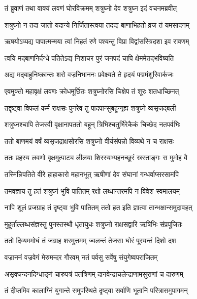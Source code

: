 \twolineshloka
{तं ब्रुवाणं तथा वाक्यं लवणं घोरविक्रमम्}
{शत्रुघ्नो देव शत्रुघ्न इदं वचनमब्रवीत्} %

\twolineshloka
{शत्रुघ्नो न तदा जातो यदान्ये निर्जितास्त्वया}
{तदद्य बाणाभिहतो व्रज तं यमसादनम्} %

\twolineshloka
{ऋषयोऽप्यद्य पापात्मन्मया त्वां निहतं रणे}
{पश्यन्तु विप्रा विद्वांसस्त्रिदशा इव रावणम्} %

\twolineshloka
{त्वयि मद्बाणनिर्दग्धे पतितेऽद्य निशाचर}
{पुरं जनपदं चापि क्षेममेतद्भविष्यति} %

\twolineshloka
{अद्य मद्बाहुनिष्क्रान्तः शरो वज्रनिभाननः}
{प्रवेक्ष्यते ते हृदयं पद्ममंशुरिवार्कजः} %

\twolineshloka
{एवमुक्तो महावृक्षं लवणः क्रोधमूर्छितः}
{शत्रुघ्नोरसि चिक्षेप तं शूरः शतधाच्छिनत्} %

\twolineshloka
{तद्दृष्ट्वा विफलं कर्म राक्षसः पुनरेव तु}
{पादपान्सुबहून्गृह्य शत्रुघ्ने व्यसृजद्बली} %

\twolineshloka
{शत्रुघ्नश्चापि तेजस्वी वृक्षानापततो बहून्}
{त्रिभिश्चतुर्भिरेकैकं चिच्छेद नतपर्वभिः} %

\twolineshloka
{ततो बाणमयं वर्षं व्यसृजद्राक्षसोरसि}
{शत्रुघ्नो वीर्यसंपन्नो विव्यथे न च राक्षसः} %

\twolineshloka
{ततः प्रहस्य लवणो वृक्षमुत्पाट्य लीलया}
{शिरस्यभ्यहनच्छूरं स्रस्ताङ्गः स मुमोह वै} %

\twolineshloka
{तस्मिन्निपतिते वीरे हाहाकारो महानभूत्}
{ऋषीणां देव संघानां गन्धर्वाप्सरसामपि} %

\twolineshloka
{तमवज्ञाय तु हतं शत्रुघ्नं भुवि पातितम्}
{रक्षो लब्धान्तरमपि न विवेश स्वमालयम्} %

\twolineshloka
{नापि शूलं प्रजग्राह तं दृष्ट्वा भुवि पातितम्}
{ततो हत इति ज्ञात्वा तान्भक्षान्समुदावहत्} %

\twolineshloka
{मुहूर्ताल्लब्धसंज्ञस्तु पुनस्तस्थौ धृतायुधः}
{शत्रुघ्नो राक्षसद्वारि ऋषिभिः संप्रपूजितः} %

\twolineshloka
{ततो दिव्यममोघं तं जग्राह शरमुत्तमम्}
{ज्वलन्तं तेजसा घोरं पूरयन्तं दिशो दश} %

\twolineshloka
{वज्राननं वज्रवेगं मेरुमन्दर गौरवम्}
{नतं पर्वसु सर्वेषु संयुगेष्वपराजितम्} %

\twolineshloka
{असृक्चन्दनदिग्धाङ्गं चारुपत्रं पतत्रिणम्}
{दानवेन्द्राचलेन्द्राणामसुराणां च दारुणम्} %

\twolineshloka
{तं दीप्तमिव कालाग्निं युगान्ते समुपस्थिते}
{दृष्ट्वा सर्वाणि भूतानि परित्रासमुपागमन्} %

